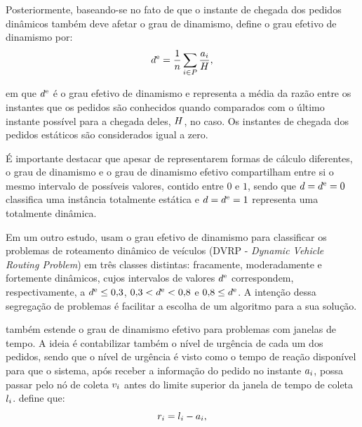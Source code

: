 Posteriormente, baseando-se no fato de que o instante de chegada dos pedidos
dinâmicos também deve afetar o grau de dinamismo,
\textcite{larsen_dynamic_2000} define o grau efetivo de dinamismo por:
%
\begin{equation}
  d^\text{e} = 
  \frac{1}{n}
  \sum_{i \in P}
  {
    \frac{a_i}{H}
  },
  \label{eq:eDegreeOfDynamism}
\end{equation}

\noindent em que $d^\text{e}$ é o grau efetivo de dinamismo e 
representa a média da razão entre os instantes que os pedidos são conhecidos 
quando comparados com o último instante possível para a chegada deles, 
$H$, no caso. Os instantes de chegada dos pedidos estáticos são 
considerados igual a zero.

É importante destacar que apesar de representarem formas de cálculo diferentes,
o grau de dinamismo e o grau de dinamismo efetivo compartilham entre si o mesmo
intervalo de possíveis valores, contido entre $0$ e $1$, sendo que
$d = d^\text{e} = 0$ classifica uma instância
totalmente estática e $d = d^\text{e} = 1$ representa
uma totalmente dinâmica.

Em um outro estudo,  usam o grau efetivo
de dinamismo para classificar os problemas de roteamento dinâmico de veículos
(DVRP - \textit{Dynamic Vehicle Routing Problem}) em três classes distintas:
fracamente, moderadamente e fortemente dinâmicos, cujos intervalos de valores 
$d^\text{e}$ correspondem, respectivamente, a $d^\text{e} \leq
0{,}3$, $0{,}3  < d^\text{e} < 0{,}8$ e $0{,}8 \leq
d^\text{e}$.
A intenção dessa segregação de problemas é facilitar a escolha de um algoritmo
para a sua solução.

 também estende o grau de dinamismo efetivo
para problemas com janelas de tempo.
A ideia é contabilizar também o nível de urgência de cada um dos pedidos, 
sendo que o nível de urgência é visto como o tempo de reação disponível
para que o sistema, após receber a informação do pedido no instante
$a_i$, possa passar pelo nó de coleta $v_{i}$
antes do limite superior da janela de tempo de coleta
$l_{i}$.
 define que: 
%
\begin{equation}
  r_i = l_{i}
                           - a_i,
\end{equation}

